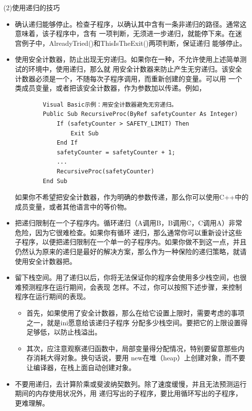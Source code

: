 \documentclass{article}
\begin{document}
\par
(2)使用递归的技巧
\par
\begin{itemize}
    \item 确认递归能够停止。检查子程序，以确认其中含有一条非递归的路径。通常这意味着，该子程序中，含有
    一项判断，无须进一步递归，就能停下来。在迷宫例子中，AlreadyTried()和ThisIsTheExit()两项判断，保证递归
    能够停止。
    \item 使用安全计数器，防止出现无穷递归。如果你在一种，不允许使用上述简单测试的环境中，使用递归，那么就
    用安全计数器来防止产生无穷递归。该安全计数器必须是一个，不随每次子程序调用，而重新创建的变量。可以用
    一个类成员变量，或者把该安全计数器，作为参数加以传递。例如，
    \begin{lstlisting}
        Visual Basic示例：用安全计数器避免无穷递归。
        Public Sub RecursiveProc(ByRef safetyCounter As Integer)
            If (safetyCounter > SAFETY_LIMIT) Then
                Exit Sub
            End If
            safetyCounter = safetyCounter + 1;
            ...
            RecursiveProc(safetyCounter)
        End Sub
    \end{lstlisting}
    如果你不希望把安全计数器，作为明确的参数传递，那么你可以使用C++中的成员变量，或者其他语言中的等价物。
    \item 把递归限制在一个子程序内。循环递归（A调用B，B调用C，C调用A）非常危险，因为它很难检查。如果你有循环
    递归，那么通常你可以重新设计这些子程序，以便把递归限制在一个单一的子程序内。如果你做不到这一点，并且
    仍然认为原来的递归是最好的解决方案，那么作为一种保险的递归策略，就请使用安全计数器把。
    \item 留下栈空间。用了递归以后，你将无法保证你的程序会使用多少栈空间，也很难预测程序在运行期间，会表现
    怎样。不过，你可以按照下述步骤，来控制程序在运行期间的表现。
    \begin{itemize}
        \item 首先，如果使用了安全计数器，那么在给它设置上限时，需要考虑的事项之一，就是ini愿意给该递归子程序
        分配多少栈空间。要把它的上限设置得足够低，以防止栈溢出。
        \item 其次，应注意观察递归函数中，局部变量得分配情况，特别要留意那些内存消耗大得对象。换句话说，要用
        new在堆（heap）上创建对象，而不要让编译器，在栈上面自动创建对象。
    \end{itemize}
    \item 不要用递归，去计算阶乘或斐波纳契数列。除了速度缓慢，并且无法预测运行期间的内存使用状况外，用
    递归写出的子程序，要比用循环写出的子程序，更难理解。
\end{itemize}
\end{document}
